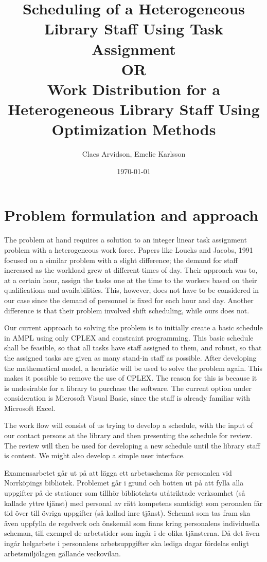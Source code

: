 \documentclass{article}
\title{Scheduling of a Heterogeneous Library Staff Using Task Assignment \\ OR \\
Work Distribution for a Heterogeneous Library Staff Using Optimization Methods}
\author{Claes Arvidson, Emelie Karlsson}
\date{\today}
\begin{document}
 
\maketitle
\pagebreak
 
\section*{Problem formulation and approach}
The problem at hand requires a solution to an integer linear task assignment problem with a heterogeneous work force. Papers like Loucks and Jacobs, 1991 focused on a similar problem with a slight difference; the demand for staff increased as the workload grew at different times of day. Their approach was to, at a certain hour, assign the tasks one at the time to the workers based on their qualifications and availabilities. This, however, does not have to be considered in our case since the demand of personnel is fixed for each hour and day. Another difference is that their problem involved shift scheduling, while ours does not.

Our current approach to solving the problem is to initially create a basic schedule in AMPL using only CPLEX and constraint programming. This basic schedule shall be feasible, so that all tasks have staff assigned to them, and robust, so that the assigned tasks are given as many stand-in staff as possible. After developing the mathematical model, a heuristic will be used to solve the problem again. This makes it possible to remove the use of CPLEX. The reason for this is because it is undesirable for a library to purchase the software. The current option under consideration is Microsoft Visual Basic, since the staff is already familiar with Microsoft Excel.

The work flow will consist of us trying to develop a schedule, with the input of our contact persons at the library and then presenting the schedule for review. The review will then be used for developing a new schedule until the library staff is content. We might also develop a simple user interface. 


\iffalse
Examensarbetet går ut på att lägga ett arbetsschema för personalen vid Norrköpings bibliotek. Problemet går i grund och botten ut på att fylla alla uppgifter på de stationer som tillhör bibliotekets utåtriktade verksamhet (så kallade yttre tjänst) med personal av rätt kompetens samtidigt som peronalen får tid över till övriga uppgifter (så kallad inre tjänst). Schemat som tas fram ska även uppfylla de regelverk och önskemål som finns kring personalens individuella scheman, till exempel de arbetstider som ingår i de olika tjänsterna. Då det även ingår helgarbete i personalens arbetsuppgifter ska lediga dagar fördelas enligt arbetsmiljölagen gällande veckovilan.
\end{document}
